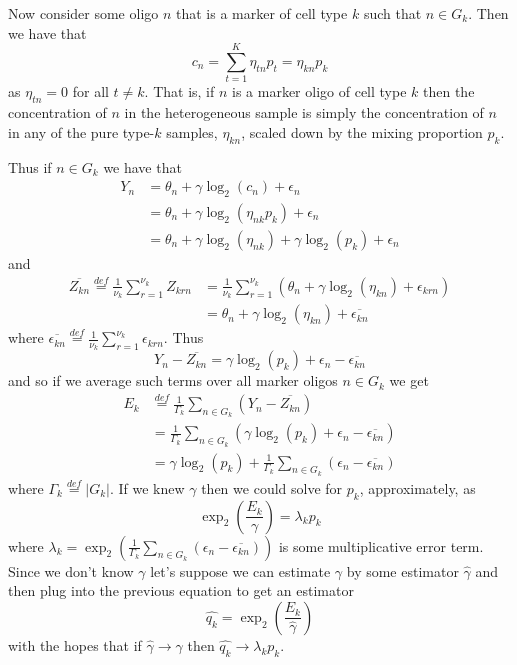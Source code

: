 \documentclass[reqno,12pt,oneside]{report}\usepackage[]{graphicx}\usepackage[]{color}
\theoremstyle{plain}
\theoremstyle{definition}
\theoremstyle{remark}
\numberwithin{theorem}{chapter}     %
\begin{document}
Now consider some oligo $n$ that is a marker of cell type $k$ such that $n\in G_k$. Then we have that
\[
c_n = \sum_{t=1}^{K} \eta_{tn}p_t = \eta_{kn} p_k
\]
as $\eta_{tn}=0$ for all $t\neq k$.
That is, if $n$ is a marker oligo of cell type $k$ then the concentration of $n$ in the heterogeneous sample is simply the concentration of $n$ in any of the pure type-$k$ samples, $\eta_{kn}$, scaled down by the mixing proportion $p_k$.

Thus if $n\in G_k$ we have that 
\[
\begin{aligned}
  Y_n &=\theta_n + \gamma\log_2\left(c_n\right)+\epsilon_n\\
  &= \theta_n + \gamma\log_2\left(\eta_{nk}p_k\right)+\epsilon_n\\
  &= \theta_n + \gamma\log_2\left(\eta_{nk}\right)+\gamma\log_2\left(p_k\right)+\epsilon_n 
\end{aligned}
\]
and
\[
\begin{aligned}
  \overline{Z_{kn}}\overset{def}{=}\frac{1}{\nu_k}\sum_{r=1}^{\nu_k}Z_{krn} &= \frac{1}{\nu_k}\sum_{r=1}^{\nu_k}\left(\theta_n + \gamma \log_2\left(\eta_{kn}\right)+\epsilon_{krn}\right)\\
  &= \theta_n + \gamma \log_2\left(\eta_{kn}\right)+\overline{\epsilon_{kn}}
\end{aligned}
\]
where $\overline{\epsilon_{kn}} \overset{def}{=} \frac{1}{\nu_k}\sum_{r=1}^{\nu_k}\epsilon_{krn}$. Thus
\[
  Y_n - \overline{Z_{kn}} = \gamma\log_2\left(p_k\right)+\epsilon_n - \overline{\epsilon_{kn}}
\]
and so if we average such terms over all marker oligos $n\in G_k$ we get
\[
\begin{aligned}
E_k &\overset{def}{=} \frac{1}{\Gamma_k} \sum_{n\in G_k}\left(Y_n-\overline{Z_{kn}}\right)\\
&=\frac{1}{\Gamma_k} \sum_{n\in G_k} \left(\gamma\log_2\left(p_k\right)+\epsilon_n - \overline{\epsilon_{kn}}\right)\\
&=\gamma\log_2\left(p_k\right)+\frac{1}{\Gamma_k} \sum_{n\in G_k}\left(\epsilon_n - \overline{\epsilon_{kn}}\right)
\end{aligned}
\]
where $\Gamma_k \overset{def}{=} |G_k|$. If we knew $\gamma$ then we could solve for $p_k$, approximately, as
\[
\exp_2\left(\frac{E_k}{\gamma}\right) = \lambda_k p_k
\]
where $\lambda_k = \exp_2\left(\frac{1}{\Gamma_k} \sum_{n\in G_k}\left(\epsilon_n - \overline{\epsilon_{kn}}\right)\right)$ is some multiplicative error term. Since we don't know $\gamma$ let's suppose we can estimate $\gamma$ by some estimator $\widehat{\gamma}$ and then plug into the previous equation to get an estimator 
\[
\widehat{q_k} = \exp_2\left(\frac{E_k}{\widehat{\gamma}}\right)
\]
with the hopes that if $\widehat{\gamma}\rightarrow\gamma$ then $\widehat{q_k}\rightarrow \lambda_kp_k$.
\end{document}
